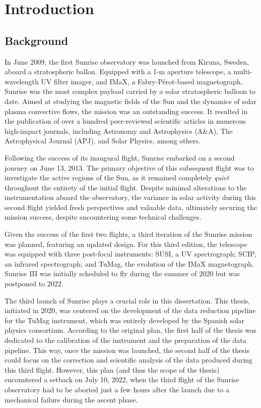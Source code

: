 \chapter{Introduction}




\section{Background}

In June 2009, the first Sunrise observatory \citep{SunriseI} was launched from Kiruna, Sweden, aboard a stratospheric ballon. Equipped with a 1-m aperture telescope, a multi-wavelength UV filter imager, and IMaX, a Fabry-Pérot-based magnetograph, Sunrise was the most complex payload carried by a solar stratospheric balloon to date. Aimed at studying the magnetic fields of the Sun and the dynamics of solar plasma convective flows, the mission was an outstanding success. It resulted in the publication of over a hundred peer-reviewed scientific articles in numerous high-impact journals, including Astronomy and Astrophysics (A\&A), The Astrophysical Journal (APJ), and Solar Physics, among others.

Following the success of its inaugural flight, Sunrise embarked on a second journey \citep{SunriseII} on June 13, 2013. The primary objective of this subsequent flight was to investigate the active regions of the Sun, as it remained completely \textit{quiet} throughout the entirety of the initial flight. Despite minimal alterations to the instrumentation aboard the observatory, the variance in solar activity during this second flight yielded fresh perspectives and valuable data, ultimately securing the mission success, despite encountering some technical challenges.

Given the success of the first two flights, a third iteration of the Sunrise mission was planned, featuring an updated design. For this third edition, the telescope was equipped with three post-focal instruments: SUSI, a UV spectrograph; SCIP, an infrared spectrograph; and TuMag, the evolution of the IMaX magnetograph. Sunrise III was initially scheduled to fly during the summer of 2020 but was postponed to 2022.

The third launch of Sunrise plays a crucial role in this dissertation. This thesis, initiated in 2020, was centered on the development of the data reduction pipeline for the TuMag instrument, which was entirely developed by the Spanish solar physics consortium. According to the original plan, the first half of the thesis was dedicated to the calibration of the instrument and the preparation of the data pipeline. This way, once the mission was launched, the second half of the thesis could focus on the correction and scientific analysis of the data produced during this third flight. However, this plan (and thus the scope of the thesis) encountered a setback on July 10, 2022, when the third flight of the Sunrise observatory had to be aborted just a few hours after the launch due to a mechanical failure during the ascent phase.

